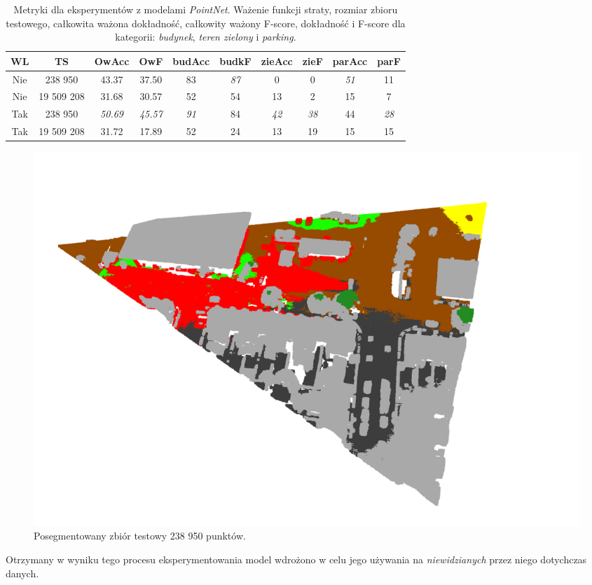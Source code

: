 \begin{table}[!h]
    \centering
    \begin{tabular}{|c|c|c|c|c|c|c|c|c|c|}
    \hline
    WL & TS & OwAcc & OwF & budAcc & budkF & zieAcc & zieF & parAcc & parF \\
    \hline 
    Nie & 238 950 & 43.37 & 37.50 & 83 & \emph{87} & 0 & 0 & \emph{51} & 11 \\
    \hline 
    Nie & 19 509 208 & 31.68 & 30.57 & 52 & 54 & 13 & 2 & 15 & 7 \\
    \hline 
    Tak & 238 950 & \emph{50.69} & \emph{45.57} & \emph{91} & 84 & \emph{42} & \emph{38} & 44 & \emph{28} \\
    \hline
    Tak & 19 509 208 & 31.72 & 17.89 & 52 & 24 & 13 & 19 & 15 & 15 \\
    \hline
    \end{tabular}
\caption{Metryki dla eksperymentów z modelami \textit{PointNet}. Ważenie funkcji straty, rozmiar zbioru testowego, całkowita ważona dokładność, całkowity ważony F-score, dokładność i F-score dla kategorii: \textit{budynek}, \textit{teren zielony} i \textit{parking}.}
\label{table:tab_seg_met}
\end{table}

\begin{figure}[!h]
    \centering
    \includegraphics[width=1.0\linewidth]{img/segmentacja/segmented_birmingham.png}
    \caption{Posegmentowany zbiór testowy 238 950 punktów.}
\label{fig:seg_bir}
\end{figure}

Otrzymany w wyniku tego procesu eksperymentowania model wdrożono w celu jego używania na \textit{niewidzianych} przez niego dotychczas danych.